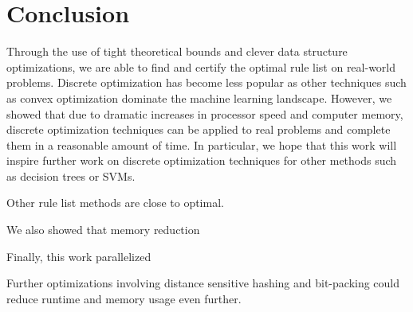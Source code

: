 \chapter{Conclusion}
\label{conclusion}
Through the use of tight theoretical bounds and clever data structure optimizations, we are able to find and certify the optimal rule list on real-world problems.
Discrete optimization has become less popular as other techniques such as convex optimization dominate the machine learning landscape.
However, we showed that due to dramatic increases in processor speed and computer memory, discrete optimization techniques can be applied to real problems and complete them in a reasonable amount of time.
In particular, we hope that this work will inspire further work on discrete optimization techniques for other methods such as decision trees or SVMs.

Other rule list methods are close to optimal.

We also showed that memory reduction

Finally, this work parallelized

Further optimizations involving distance sensitive hashing and bit-packing could reduce runtime and memory usage even further.
